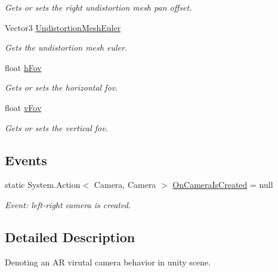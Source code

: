 \begin{DoxyCompactItemize}
\begin{DoxyCompactList}\small\item\em Gets or sets the right undistortion mesh pan offset. \end{DoxyCompactList}\item 
Vector3 \mbox{\hyperlink{class_ximmerse_1_1_slide_in_s_d_k_1_1_a_r_camera_ac9a1b2ad89ee3def2bc0edd322015be2}{Undistortion\+Mesh\+Euler}}
\begin{DoxyCompactList}\small\item\em Gets the undistortion mesh euler. \end{DoxyCompactList}\item 
float \mbox{\hyperlink{class_ximmerse_1_1_slide_in_s_d_k_1_1_a_r_camera_a3c30ba34420646eb9db9c4a67f8bbc13}{h\+Fov}}
\begin{DoxyCompactList}\small\item\em Gets or sets the horizontal fov. \end{DoxyCompactList}\item 
float \mbox{\hyperlink{class_ximmerse_1_1_slide_in_s_d_k_1_1_a_r_camera_a7c368022a57cf82fecc66c5484b4820f}{v\+Fov}}
\begin{DoxyCompactList}\small\item\em Gets or sets the vertical fov. \end{DoxyCompactList}\end{DoxyCompactItemize}
\subsection*{Events}
\begin{DoxyCompactItemize}
\item 
static System.\+Action$<$ Camera, Camera $>$ \mbox{\hyperlink{class_ximmerse_1_1_slide_in_s_d_k_1_1_a_r_camera_a5b56624a86763a503902cf9bba98da01}{On\+Camera\+Is\+Created}} = null
\begin{DoxyCompactList}\small\item\em Event\+: left-\/right camera is created. \end{DoxyCompactList}\end{DoxyCompactItemize}


\subsection{Detailed Description}
Denoting an AR virutal camera behavior in unity scene. 



